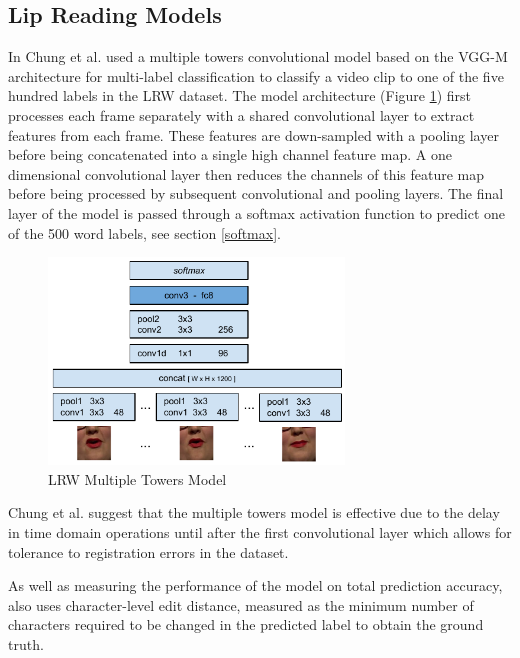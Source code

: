 \subsection{Lip Reading Models} \label{sec:lip_reading_models}
In \cite{Chung2016} Chung et al. used a multiple towers convolutional model based on the VGG-M architecture for multi-label classification to classify a video clip to one of the five hundred labels in the LRW dataset.
The model architecture (Figure \ref{fig:LRW_Multiple_Towers}) first processes each frame separately with a shared convolutional layer to extract features from each frame.
These features are down-sampled with a pooling layer before being concatenated into a single high channel feature map.
A one dimensional convolutional layer then reduces the channels of this feature map before being processed by subsequent convolutional and pooling layers.
The final layer of the model is passed through a softmax activation function to predict one of the 500 word labels, see section \ref{softmax}.

\begin{figure}[h]
    \centering
        \includegraphics[width=0.7\textwidth]{figures/lit_review/lrw_multiple_towers.png}
    \caption{LRW Multiple Towers Model \cite{Chung2016}}\label{fig:LRW_Multiple_Towers}
\end{figure}

Chung et al. suggest that the multiple towers model is effective due to the delay in time domain operations until after the first convolutional layer which allows for tolerance to registration errors in the dataset.

As well as measuring the performance of the model on total prediction accuracy, \cite{Chung2016} also uses character-level edit distance, measured as the minimum number of characters required to be changed in the predicted label to obtain the ground truth.


